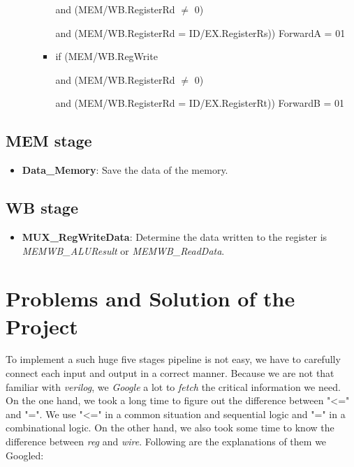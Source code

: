 \documentclass{article}
\begin{document}
\begin{itemize}
\begin{enumerate}
\begin{itemize}
                      and (MEM/WB.RegisterRd $\ne$ 0) 
                    
                      and (MEM/WB.RegisterRd = ID/EX.RegisterRs)) ForwardA = 01
                
                \item if (MEM/WB.RegWrite 
                    
                      and (MEM/WB.RegisterRd $\ne$ 0) 
                      
                      and (MEM/WB.RegisterRd = ID/EX.RegisterRt)) ForwardB = 01
            \end{itemize}
        \end{enumerate}
    \end{itemize}

    \subsection*{MEM stage}
    \begin{itemize}
        \item \textbf{Data\_Memory}: Save the data of the memory.
    \end{itemize}

    \subsection*{WB stage}
    \begin{itemize}
        \item \textbf{MUX\_RegWriteData}: Determine the data written to the register is \textit{MEMWB\_ALUResult} or \textit{MEMWB\_ReadData}.
    \end{itemize}
    
    \newpage
    \section{Problems and Solution of the Project}
    To implement a such huge five stages pipeline is not easy, 
    we have to carefully connect each input and output in a correct manner. 
    Because we are not that familiar with \textit{verilog}, 
    we \textit{Google} a lot to \textit{fetch} the critical information we need. \\

    On the one hand, we took a long time to figure out the difference between "<=" and "=". 
    We use "<=" in a common situation and sequential logic and "=" in a combinational logic. 
    On the other hand, we also took some time to know the difference between \textit{reg} and \textit{wire}. 
    Following are the explanations of them we Googled: 
\end{document}
